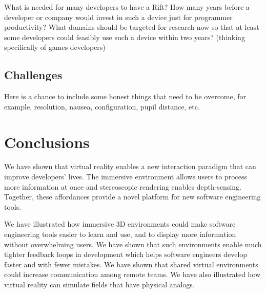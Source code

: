 \documentclass[conference]{IEEEtran}
\begin{document}
What is needed for many developers to have a Rift? 
How many years before a developer or company would invest in such a device just for programmer productivity? 
What domains should be targeted for research now so that at least some developers could feasibly use such a device within two years? (thinking specifically of games developers)

\subsection{Challenges}
Here is a chance to include some honest things that need to be overcome, for example, resolution, nausea, configuration, pupil distance, etc.

\section{Conclusions}
We have shown that virtual reality enables a new interaction paradigm that can improve developers' lives. 
The immersive environment allows users to process more information at once and stereoscopic rendering enables depth-sensing. 
Together, these affordances provide a novel platform for new software engineering tools.

We have illustrated how immersive 3D environments could make software engineering tools easier to learn and use, and to display more information without overwhelming users. 
We have shown that such environments enable much tighter feedback loops in development which helps software engineers develop faster and with fewer mistakes. 
We have shown that shared virtual environments could increase communication among remote teams. 
We have also illustrated how virtual reality can simulate fields that have physical analogs.



\end{document}
